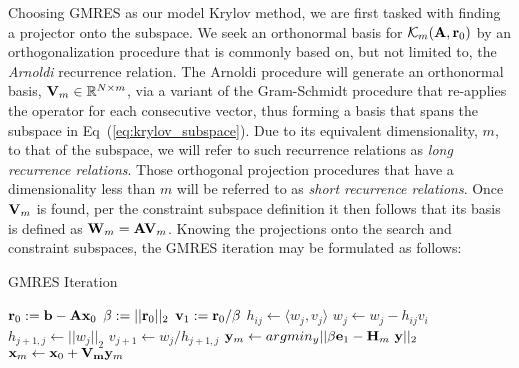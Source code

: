 Choosing GMRES as our model Krylov method, we are first tasked with
finding a projector onto the subspace. We seek an orthonormal basis
for $\mathcal{K}_m(\mathbf{A},\mathbf{r}_0)$ by an orthogonalization procedure
that is commonly based on, but not limited to, the \textit{Arnoldi}
recurrence relation. The Arnoldi procedure will generate an
orthonormal basis, $\mathbf{V}_m \in \mathbb{R}^{N \times m}$, via a
variant of the Gram-Schmidt procedure that re-applies the operator for
each consecutive vector, thus forming a basis that spans the subspace
in Eq~(\ref{eq:krylov_subspace}). Due to its equivalent
dimensionality, $m$, to that of the subspace, we will refer to such
recurrence relations as \textit{long recurrence relations}. Those
orthogonal projection procedures that have a dimensionality less than
$m$ will be referred to as \textit{short recurrence relations}.  Once
$\mathbf{V}_m$ is found, per the constraint subspace definition it then
follows that its basis is defined as $\mathbf{W}_m = \mathbf{A}
\mathbf{V}_m$. Knowing the projections onto the search and constraint
subspaces, the GMRES iteration may be formulated as follows:
\begin{algorithm}[t!]
  \caption{GMRES Iteration}
  \label{alg:gmres}
  \begin{algorithmic}
    \State $\mathbf{r}_0 := \mathbf{b}-\mathbf{A}\mathbf{x}_0$
    \State $\beta := ||\mathbf{r}_0||_2$
    \State $\mathbf{v}_1 := \mathbf{r}_0 / \beta$
    \State $h_{ij} \leftarrow \langle w_j,v_j \rangle$
    \State $w_j \leftarrow w_j - h_{ij}v_i$
    \EndFor
    \State $h_{j+1,j} \leftarrow ||w_j||_2$
    \State $v_{j+1} \leftarrow w_j / h_{j+1,j}$
    \State $\mathbf{y}_m \leftarrow argmin_y ||\beta \mathbf{e}_1 - \mathbf{H}_m\
    \mathbf{y}||_2 $
    \State $\mathbf{x}_m \leftarrow \mathbf{x}_0 + \mathbf{V_m} \mathbf{y}_m$
  \end{algorithmic}
\end{algorithm}

